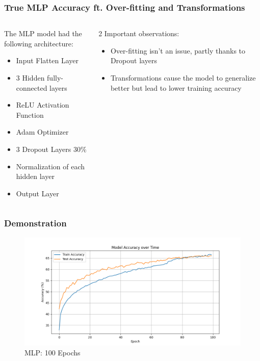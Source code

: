     
\begin{frame}
\frametitle{True MLP Accuracy ft. Over-fitting and Transformations}
\begin{columns}
    \begin{column}{0.5\textwidth}
        The MLP model had the following architecture:
        \begin{itemize}
            \item Input Flatten Layer
            \item 3 Hidden fully-connected layers
            \item ReLU Activation Function
            \item Adam Optimizer
            \item 3 Dropout Layers 30\% 
            \item Normalization of each hidden layer
            \item Output Layer
        \end{itemize}
    \end{column}

    \begin{column}{0.5\textwidth}
        2 Important observations:
        \begin{itemize}
            \item Over-fitting isn't an issue, partly thanks to Dropout layers
            \item Transformations cause the model to generalize better but lead to 
            lower training accuracy
        \end{itemize}
    \end{column}
\end{columns}
\end{frame}

\begin{frame}
\frametitle{Demonstration}
\begin{figure}
    \centering
    \includegraphics[width=1\textwidth]{media/1stAssignment/mlp_final_state.png}
    \caption{MLP: 100 Epochs}
\end{figure}
\end{frame}

